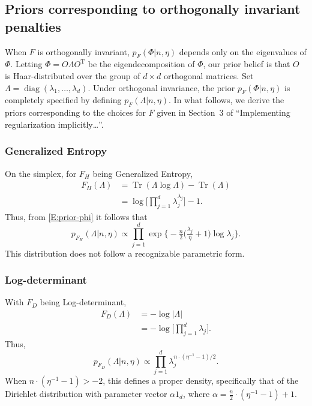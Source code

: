 \documentclass[11pt]{article}
\newcommand{\trans}{\mathrm{T}}
\DeclareMathOperator*{\Tr}{Tr}
\DeclareMathOperator*{\diag}{diag}
\begin{document}
\subsection{Priors corresponding to orthogonally invariant penalties}

When $F$ is orthogonally invariant, $p_F(\Phi | n, \eta)$ depends only on the
eigenvalues of $\Phi$.  Letting $\Phi = O \Lambda O^\trans$ be the
eigendecomposition of $\Phi$, our prior belief is that $O$ is Haar-distributed over
the group of $d\times d$ orthogonal matrices.  Set
$\Lambda = \diag(\lambda_1, \ldots, \lambda_d)$.  Under orthogonal invariance,
the prior $p_F(\Phi | n, \eta)$ is completely specified by defining
$p_F(\Lambda | n, \eta)$.  In what follows, we derive the priors corresponding
to the choices for $F$ given in Section~3 of ``Implementing regularization
implicitly\ldots''.

\subsubsection*{Generalized Entropy}

On the simplex, for $F_H$ being Generalized Entropy,
\begin{align*}
    F_H(\Lambda)
        &= \Tr(\Lambda \log \Lambda) - \Tr(\Lambda) \\
        &= \log \Big[ \prod_{j=1}^d \lambda_j^{\lambda_j} \Big] - 1.
\end{align*}
Thus, from \eqref{E:prior-phi} it follows that
\[
    p_{F_H}(\Lambda | n, \eta)
        \propto
            \prod_{j=1}^d
                \exp\Big\{
                    -\tfrac{n}{2}
                    \big(
                        \tfrac{\lambda_j}{\eta}
                        +
                        1
                    \big)
                    \log \lambda_j
                \Big\}.
\]
This distribution does not follow a recognizable parametric form.


\subsubsection*{Log-determinant}

With $F_D$ being Log-determinant,
\begin{align*}
    F_D(\Lambda)
        &= -\log |\Lambda| \\
        &= -\log \Big[ \prod_{j=1}^d \lambda_j \Big].
\end{align*}
Thus,
\[
    p_{F_D}(\Lambda | n, \eta)
        \propto
            \prod_{j=1}^d
                \lambda_j^{n \cdot (\eta^{-1} - 1)/2}.
\]
When $n \cdot (\eta^{-1} - 1) > -2$, this defines a proper density, specifically
that of the Dirichlet distribution with parameter vector $\alpha 1_d$, where
$\alpha = \tfrac{n}{2} \cdot (\eta^{-1} - 1) + 1$.
\end{document}

